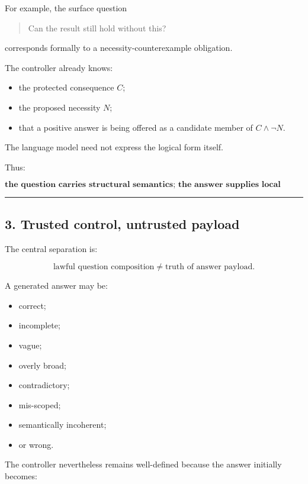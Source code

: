 \documentclass[
]{article}
\providecommand{\tightlist}{%
  \setlength{\itemsep}{0pt}\setlength{\parskip}{0pt}}
\begin{document}
For example, the surface question

\begin{quote}
Can the result still hold without this?
\end{quote}

corresponds formally to a necessity-counterexample obligation.

The controller already knows:

\begin{itemize}
\tightlist
\item
  the protected consequence \(C\);
\item
  the proposed necessity \(N\);
\item
  that a positive answer is being offered as a candidate member of
  \(C\land\neg N\).
\end{itemize}

The language model need not express the logical form itself.

Thus:

\[
\boxed{
\textbf{the question carries structural semantics;
the answer supplies local semantic content.}
}
\]

\begin{center}\rule{0.5\linewidth}{0.5pt}\end{center}

\subsection{3. Trusted control, untrusted
payload}\label{trusted-control-untrusted-payload}

The central separation is:

\[
\boxed{
\text{lawful question composition}
\neq
\text{truth of answer payload}.
}
\]

A generated answer may be:

\begin{itemize}
\tightlist
\item
  correct;
\item
  incomplete;
\item
  vague;
\item
  overly broad;
\item
  contradictory;
\item
  mis-scoped;
\item
  semantically incoherent;
\item
  or wrong.
\end{itemize}

The controller nevertheless remains well-defined because the answer
initially becomes:
\end{document}
